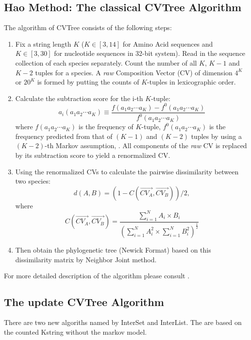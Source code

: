 \documentclass[a4paper,12pt]{article}
\begin{document}
\subsection{Hao Method: The classical CVTree Algorithm}
The algorithm of CVTree consists of the following steps:
\begin{enumerate}\itemsep 0pt
	\item Fix a string length $K$ ($K\in [3,14]$ for Amino Acid sequences and
	   $K\in [3,30]$ for nucleotide sequences in 32-bit system). Read in the
	   sequence collection of each species separately. Count the number of
	   all $K$, $K-1$ and $K-2$ tuples for a species. A {\it raw} Composition
	   Vector (CV) of dimension $4^K$ or ${20}^K$ is formed by putting the
	   counts of $K$-tuples in lexicographic order.
	\item Calculate the subtraction score for the i-th $K$-tuple:
	   \begin{equation*}
		   a_i(a_1a_2 \cdots a_K) \equiv \frac{f(a_1a_2 \cdots a_K) -
			   f^0(a_1a_2 \cdots a_K)}{f^0(a_1a_2 \cdots a_K)}
	   \end{equation*}
	   where $f(a_1a_2 \cdots a_K)$ is the frequency of $K$-tuple, $f^0(a_1a_2
		   \cdots a_K)$ is the frequency predicted from that of $(K-1)$ and $(K-2)$
	   tuples by using a $(K-2)$-th Markov assumption, \cite{qwh04}.  All
	   components of the {\it raw} CV is replaced by its subtraction score to
	   yield a renormalized CV.
	\item Using the renormalized CVs to calculate the pairwise dissimilarity
	   between two species:
	   $$d(A, B)=(1-C(\vec{CV_A},\vec{CV_B}))/2,$$
	   where
	   \begin{equation*}
		   C(\vec{CV_A},\vec{CV_B})=\frac{\sum_{i=1}^NA_i \times
			   B_i}{(\sum_{i=1}^NA_i^2 \times \sum_{i=1}^NB_i^2)^{\frac{1}{2}}}
	   \end{equation*}

	\item Then obtain the phylogenetic tree (Newick Format) based on this
	   dissimilarity matrix by Neighbor Joint method.
\end{enumerate}
For more detailed description of the algorithm please consult
\cite{qwh04}.

\subsection{The update CVTree Algorithm}
There are two new algoriths named by InterSet and InterList. The are based on the
counted Kstring without the markov model.
\end{document}
